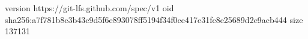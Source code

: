 version https://git-lfs.github.com/spec/v1
oid sha256:a7f781b8c3b43c9d5f6e893078ff5194f34f0ce417e31fc8e25689d2e9acb444
size 137131
